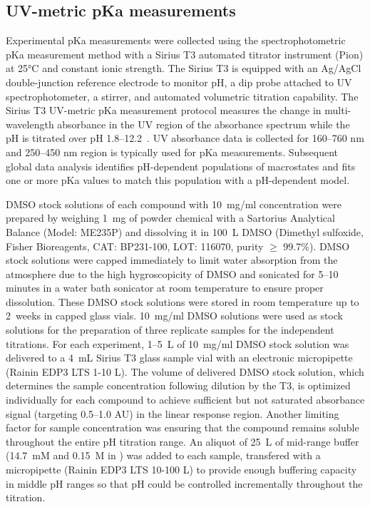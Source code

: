 \documentclass[9pt,lineno]{elife}
\begin{document}
\subsection{UV-metric pKa measurements}

Experimental pKa measurements were collected using the spectrophotometric pKa measurement method with a Sirius T3 automated titrator instrument (Pion) at 25°C and constant ionic strength. 
The Sirius T3 is equipped with an Ag/AgCl double-junction reference electrode to monitor pH, a dip probe attached to UV spectrophotometer, a stirrer, and automated volumetric titration capability. 
The Sirius T3 UV-metric pKa measurement protocol measures the change in multi-wavelength absorbance in the UV region of the absorbance spectrum while the pH is titrated over pH 1.8--12.2~\citep{tam_multi-wavelength_2001, allen_multiwavelength_1998}. UV absorbance data is collected for 160--760 nm and 250--450 nm region is typically used for pKa measurements.
Subsequent global data analysis identifies pH-dependent populations of macrostates and fits one or more pKa values to match this population with a pH-dependent model.

DMSO stock solutions of each compound with 10~mg/ml concentration were prepared by weighing 1~mg of powder chemical with a Sartorius Analytical Balance (Model: ME235P) and dissolving it in 100~{\micro}L DMSO (Dimethyl sulfoxide, Fisher Bioreagents, CAT: BP231-100, LOT: 116070, purity $\geq$ 99.7\%).  
DMSO stock solutions were capped immediately to limit water absorption from the atmosphere due to the high hygroscopicity of DMSO and sonicated for 5--10 minutes in a water bath sonicator at room temperature to ensure proper dissolution. 
These DMSO stock solutions were stored in room temperature up to 2~weeks in capped glass vials. 
10~mg/ml DMSO solutions were used as stock solutions for the preparation of three replicate samples for the independent titrations.  For each experiment, 1--5~{\micro}L of 10~mg/ml DMSO stock solution was delivered to a 4~mL Sirius T3 glass sample vial with an electronic micropipette (Rainin EDP3 LTS 1-10 \micro L). 
The volume of delivered DMSO stock solution, which determines the sample concentration following dilution by the T3, is optimized individually for each compound to achieve sufficient but not saturated absorbance signal (targeting 0.5--1.0 AU) in the linear response region. 
Another limiting factor for sample concentration was ensuring that the compound remains soluble throughout the entire pH titration range. An aliquot of
25~{\micro}L of mid-range buffer (14.7~mM  and 0.15~M  in ) was added to each sample, transfered with a micropipette (Rainin EDP3 LTS 10-100 \micro L) to provide enough buffering capacity in middle pH ranges so that pH could be controlled incrementally throughout the titration.  
\end{document}
